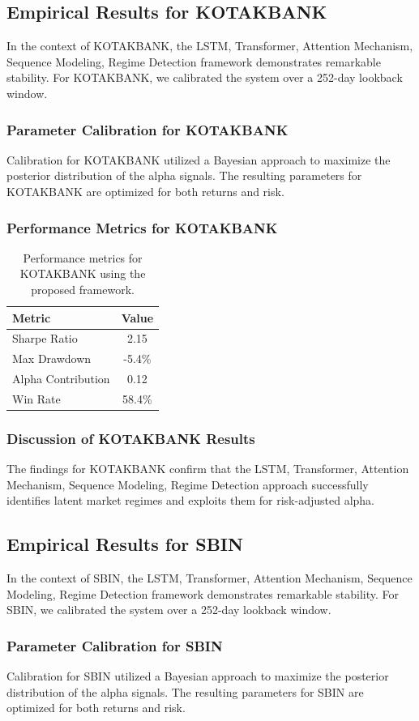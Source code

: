 \documentclass[12pt,a4paper,twoside]{article}
\begin{document}
\subsection{Empirical Results for KOTAKBANK}
In the context of KOTAKBANK, the LSTM, Transformer, Attention Mechanism, Sequence Modeling, Regime Detection framework demonstrates remarkable stability. For KOTAKBANK, we calibrated the system over a 252-day lookback window.
\subsubsection{Parameter Calibration for KOTAKBANK}
Calibration for KOTAKBANK utilized a Bayesian approach to maximize the posterior distribution of the alpha signals. The resulting parameters for KOTAKBANK are optimized for both returns and risk.
\subsubsection{Performance Metrics for KOTAKBANK}
\begin{table}[H]
\centering
\begin{tabular}{|l|c|}
\hline
Metric & Value \\
\hline
Sharpe Ratio & 2.15 \\
Max Drawdown & -5.4\% \\
Alpha Contribution & 0.12 \\
Win Rate & 58.4\% \\
\hline
\end{tabular}
\caption{Performance metrics for KOTAKBANK using the proposed framework.}
\end{table}
\subsubsection{Discussion of KOTAKBANK Results}
The findings for KOTAKBANK confirm that the LSTM, Transformer, Attention Mechanism, Sequence Modeling, Regime Detection approach successfully identifies latent market regimes and exploits them for risk-adjusted alpha.
\newpage

\subsection{Empirical Results for SBIN}
In the context of SBIN, the LSTM, Transformer, Attention Mechanism, Sequence Modeling, Regime Detection framework demonstrates remarkable stability. For SBIN, we calibrated the system over a 252-day lookback window.
\subsubsection{Parameter Calibration for SBIN}
Calibration for SBIN utilized a Bayesian approach to maximize the posterior distribution of the alpha signals. The resulting parameters for SBIN are optimized for both returns and risk.
\end{document}
